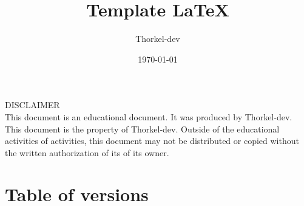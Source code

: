 \documentclass[a4paper,11pt,titlepage]{article}
\author{Thorkel-dev}        %
\title{Template \LaTeX}     %
\date{\normalsize\today}    %
\begin{document}
\maketitle

\BgThispage %
\vspace*{\fill}
\noindent
DISCLAIMER \\
This document is an educational document. It was produced by Thorkel-dev.
This document is the property of Thorkel-dev. Outside of the educational activities of
activities, this document may not be distributed or copied without the written authorization of its
of its owner.
\vspace*{\fill}
\clearpage

\section*{Table of versions}
 \label{TableOfVersion} %
\clearpage

\tableofcontents %







\printglossary[type=\acronymtype] \label{acronyms}
\glsaddallunused %

\printglossary[] \label{domaindictionary} %
\glsaddallunused %

\listoffigures \label{TableOfFigure} %

\listoflistings \label{TableOfCode} %

\printbibliography[heading=bibnumbered, label=bibliography] %
\nocite{*} %

\clearpage
\null
\thispagestyle{empty}%
\addtocounter{page}{-1}%
\BgThispage
\end{document}
